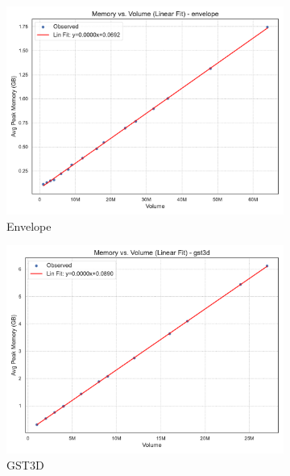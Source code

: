 \begin{figure}[htbp]
    \centering
    \begin{subfigure}[t]{0.32\textwidth}
        \includegraphics[width=\textwidth]{assets/images/05/memory_vs_volume_regression_envelope}
        \caption{Envelope}
    \end{subfigure}
    \hfill
    \begin{subfigure}[t]{0.32\textwidth}
        \includegraphics[width=\textwidth]{assets/images/05/memory_vs_volume_regression_gst3d}
        \caption{\ac{GST3D}}
    \end{subfigure}
    \hfill
    \begin{subfigure}[t]{0.32\textwidth}

\end{subfigure}
\end{figure}
